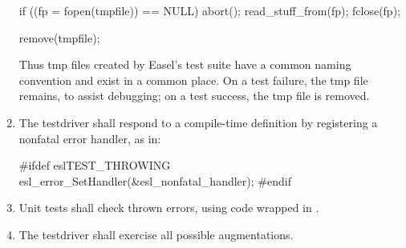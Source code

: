 \begin{enumerate}
\begin{cchunk}
          if ((fp = fopen(tmpfile)) == NULL)      abort();
          read_stuff_from(fp);
          fclose(fp);

          remove(tmpfile);
\end{cchunk}

      Thus tmp files created by Easel's test suite have a common
      naming convention and exist in a common place. On a test
      failure, the tmp file remains, to assist debugging; on a test
      success, the tmp file is removed.

\item The testdriver shall respond to a 
      compile-time definition by registering a nonfatal error handler,
      as in:
\begin{cchunk}
      #ifdef eslTEST_THROWING
        esl_error_SetHandler(&esl_nonfatal_handler);
      #endif
\end{cchunk}

\item Unit tests shall check thrown errors, using code
      wrapped in .

\item The testdriver shall exercise all possible augmentations.
\end{enumerate}










